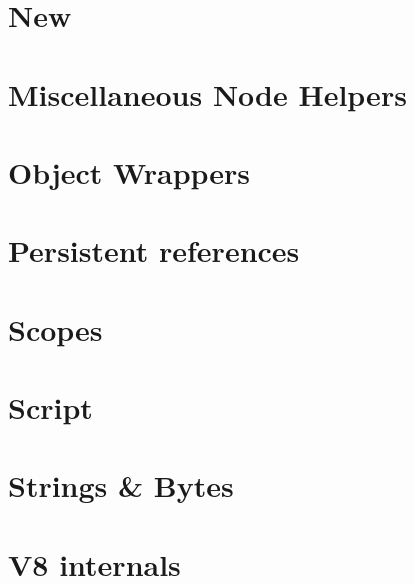 \documentclass[twoside]{book}
\newcommand{\+}{\discretionary{\mbox{\scriptsize$\hookleftarrow$}}{}{}}
\begin{document}
\chapter{New}
\label{md_app_web_node_modules_nan_doc_new}

\chapter{Miscellaneous Node Helpers}
\label{md_app_web_node_modules_nan_doc_node_misc}

\chapter{Object Wrappers}
\label{md_app_web_node_modules_nan_doc_object_wrappers}

\chapter{Persistent references}
\label{md_app_web_node_modules_nan_doc_persistent}

\chapter{Scopes}
\label{md_app_web_node_modules_nan_doc_scopes}

\chapter{Script}
\label{md_app_web_node_modules_nan_doc_script}

\chapter{Strings \& Bytes}
\label{md_app_web_node_modules_nan_doc_string_bytes}

\chapter{V8 internals}
\label{md_app_web_node_modules_nan_doc_v8_internals}

\end{document}

